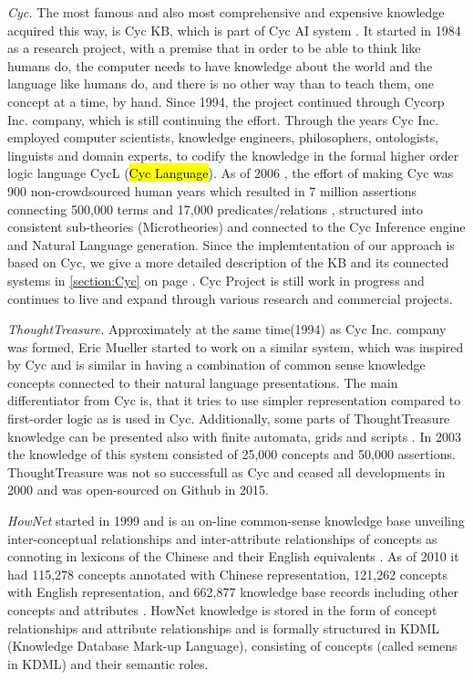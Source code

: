 \emph{Cyc.} The most famous and also most comprehensive and expensive knowledge acquired this way, is Cyc KB, which is part of Cyc AI system \parencite{Lenat1995}. It started in 1984 as a research project, with a premise that in order to be able to think like humans do, the computer needs to have knowledge about the world and the language like humans do, and there is no other way than to teach them, one concept at a time, by hand. Since 1994, the project continued through Cycorp Inc. company, which is still continuing the effort. Through the years Cyc Inc. employed computer scientists, knowledge engineers, philosophers, ontologists, linguists and domain experts, to codify the knowledge in the formal higher order logic language CycL (\hl{Cyc Language}). As of 2006   \parencite{Matuszek2006}, the effort of making Cyc was 900 non-crowdsourced human years which resulted in 7 million assertions connecting 500,000 terms and 17,000 predicates/relations \parencite{Zang2013}, structured into consistent sub-theories (Microtheories) and connected to the Cyc Inference engine and Natural Language generation. Since the implemtentation of our approach is based on Cyc, we give a more detailed description of the KB and its connected systems in \autoref{section:Cyc} on page \pageref{section:Cyc}. Cyc Project is still work in progress and continues to live and expand through various research and commercial projects.

\emph{ThoughtTreasure.} Approximately at the same time(1994) as Cyc Inc. company was formed, Eric Mueller started to work on a similar system, which was inspired by Cyc and is similar in having a combination of common sense knowledge concepts connected to their natural language presentations. The main differentiator from Cyc is, that it tries to use simpler representation compared to first-order logic as is used in Cyc. Additionally, some parts of ThoughtTreasure knowledge can be presented also with finite automata, grids and scripts \parencite{Mueller1999,Mueller2003}. In 2003 the knowledge of this system consisted of 25,000 concepts and 50,000 assertions. ThoughtTreasure was not so successfull as Cyc and ceased all developments in 2000 and was open-sourced on Github in 2015.

\emph{HowNet} started in 1999 and is an on-line common-sense knowledge base unveiling inter-conceptual relationships and inter-attribute relationships of concepts as connoting in lexicons of the Chinese and their English equivalents . As of 2010 it had 115,278 concepts annotated with Chinese representation, 121,262 concepts with English representation, and 662,877 knowledge base records including other concepts and attributes \parencite{Dong2010}. HowNet knowledge is stored in the form of concept relationships and attribute relationships and is formally structured in KDML (Knowledge Database Mark-up Language), consisting of concepts (called semens in KDML) and their semantic roles.
 
